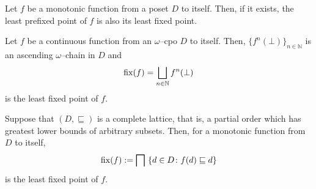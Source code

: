 \begin{lem}\label{lem:cpo-prefixed}
  Let \(f\) be a monotonic function from a poset \(D\) to itself.
  Then, if it exists, the least prefixed point of \(f\) is also its least fixed point.
\end{lem}

\begin{thm}\label{thm:cpo-fixed}
  Let \(f\) be a continuous function from an \(\omega\)--cpo \(D\) to itself.
  Then, \(\lbrace f^n(\bot) \rbrace_{n \in \mathbb{N}}\) is an ascending \(\omega\)--chain in \(D\) and
  \begin{equation}
    \operatorname{fix}(f) = \bigsqcup_{n \in \mathbb{N}} f^n(\bot)
  \end{equation}
  is the least fixed point of \(f\).  
\end{thm}

\begin{thm}\label{thm:knaster-tarski}
  Suppose that \((D, {}\sqsubseteq)\) is a complete lattice, that is, a partial order which has greatest lower bounds of arbitrary subsets.
  Then, for a monotonic function from \(D\) to itself,
  \begin{equation}
    \fix(f) := \bigsqcap\,\,\lbrace d \in D \colon f(d) \sqsubseteq d \rbrace
  \end{equation}
  is the least fixed point of \(f\).
\end{thm}